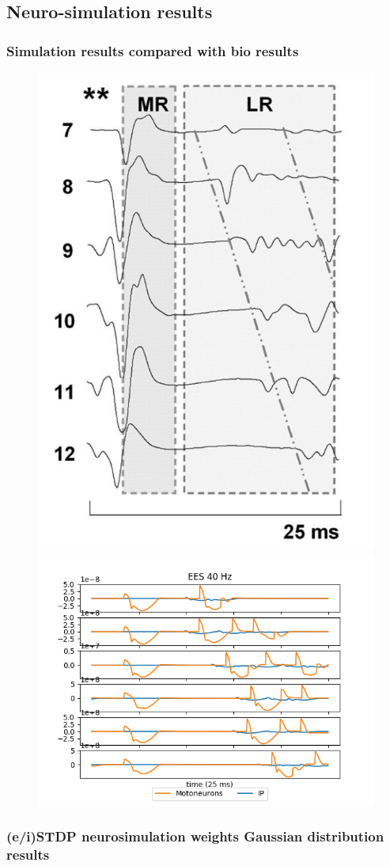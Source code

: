 \documentclass[12pt, aspectratio=169]{beamer}
\begin{document}
\subsection{Neuro-simulation results}
\begin{frame}
  \frametitle{Simulation results compared with bio results}
  \begin{figure}
    \includegraphics[width=0.2725\linewidth]{mscs_biological_results}
    \includegraphics[width=0.60\linewidth]{cpg_40Hz_100p}
  \end{figure}
\end{frame}

\subsubsection{(e/i)STDP neurosimulation weights Gaussian distribution results}
\end{document}
